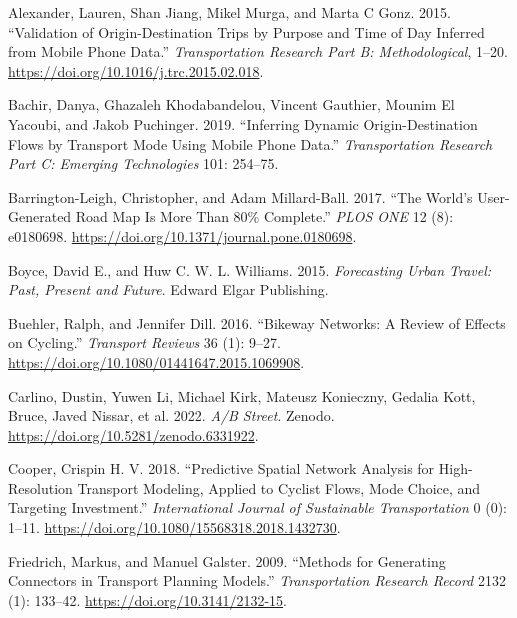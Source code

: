 \documentclass[
]{article}
\newlength{\cslhangindent}
\newlength{\cslentryspacingunit} %
\newenvironment{CSLReferences}[2] %
 {%
  \setlength{\parindent}{0pt}
  \ifodd #1
  \let\oldpar\par
  \def\par{\hangindent=\cslhangindent\oldpar}
  \fi
  \setlength{\parskip}{#2\cslentryspacingunit}
 }%
 {}
\begin{document}
\hypertarget{refs}{}
\begin{CSLReferences}{1}{0}
\leavevmode{}%
Alexander, Lauren, Shan Jiang, Mikel Murga, and Marta C Gonz. 2015. {``Validation of Origin-Destination Trips by Purpose and Time of Day Inferred from Mobile Phone Data.''} \emph{Transportation Research Part B: Methodological}, 1--20. \url{https://doi.org/10.1016/j.trc.2015.02.018}.

\leavevmode{}%
Bachir, Danya, Ghazaleh Khodabandelou, Vincent Gauthier, Mounim El Yacoubi, and Jakob Puchinger. 2019. {``Inferring Dynamic Origin-Destination Flows by Transport Mode Using Mobile Phone Data.''} \emph{Transportation Research Part C: Emerging Technologies} 101: 254--75.

\leavevmode{}%
Barrington-Leigh, Christopher, and Adam Millard-Ball. 2017. {``The World's User-Generated Road Map Is More Than 80\% Complete.''} \emph{PLOS ONE} 12 (8): e0180698. \url{https://doi.org/10.1371/journal.pone.0180698}.

\leavevmode{}%
Boyce, David E., and Huw C. W. L. Williams. 2015. \emph{Forecasting {Urban Travel}: {Past}, {Present} and {Future}}. {Edward Elgar Publishing}.

\leavevmode{}%
Buehler, Ralph, and Jennifer Dill. 2016. {``Bikeway {Networks}: {A Review} of {Effects} on {Cycling}.''} \emph{Transport Reviews} 36 (1): 9--27. \url{https://doi.org/10.1080/01441647.2015.1069908}.

\leavevmode{}%
Carlino, Dustin, Yuwen Li, Michael Kirk, Mateusz Konieczny, Gedalia Kott, Bruce, Javed Nissar, et al. 2022. \emph{A/{B Street}}. {Zenodo}. \url{https://doi.org/10.5281/zenodo.6331922}.

\leavevmode{}%
Cooper, Crispin H. V. 2018. {``Predictive Spatial Network Analysis for High-Resolution Transport Modeling, Applied to Cyclist Flows, Mode Choice, and Targeting Investment.''} \emph{International Journal of Sustainable Transportation} 0 (0): 1--11. \url{https://doi.org/10.1080/15568318.2018.1432730}.

\leavevmode{}%
Friedrich, Markus, and Manuel Galster. 2009. {``Methods for {Generating Connectors} in {Transport Planning Models}.''} \emph{Transportation Research Record} 2132 (1): 133--42. \url{https://doi.org/10.3141/2132-15}.


\end{CSLReferences}
\end{document}
